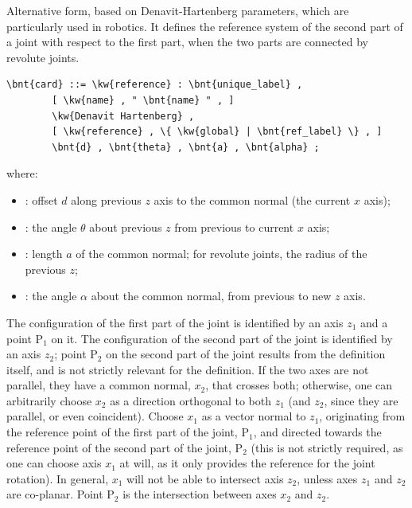 Alternative form, based on Denavit-Hartenberg parameters,
which are particularly used in robotics.
It defines the reference system of the second part of a joint with respect to the first part,
when the two parts are connected by revolute joints.
\begin{Verbatim}[commandchars=\\\{\}]
    \bnt{card} ::= \kw{reference} : \bnt{unique_label} , 
        [ \kw{name} , " \bnt{name} " , ]
        \kw{Denavit Hartenberg} ,
        [ \kw{reference} , \{ \kw{global} | \bnt{ref_label} \} , ]
        \bnt{d} , \bnt{theta} , \bnt{a} , \bnt{alpha} ;
\end{Verbatim}
where:
\begin{itemize}
\item {}: offset $d$ along previous $z$ axis to the common normal (the current $x$ axis);

\item {}: the angle $\theta$ about previous $z$ from previous to current $x$ axis;

\item {}: length $a$ of the common normal; for revolute joints, the radius of the previous $z$;

\item {}: the angle $\alpha$ about the common normal, from previous to new $z$ axis.
\end{itemize}
The configuration of the first part of the joint is identified by an axis $z_1$ and a point $\text{P}_1$ on it.
The configuration of the second part of the joint is identified by an axis $z_2$;
point $\text{P}_2$ on the second part of the joint results from the definition itself,
and is not strictly relevant for the definition.
If the two axes are not parallel, they have a common normal, $x_2$, that crosses both;
otherwise, one can arbitrarily choose $x_2$ as a direction orthogonal to both $z_1$
(and $z_2$, since they are parallel, or even coincident).
Choose $x_1$ as a vector normal to $z_1$, originating from the reference point of the first part of the joint, $\text{P}_1$,
and directed towards the reference point of the second part of the joint, $\text{P}_2$
(this is not strictly required, as one can choose axis $x_1$ at will, as it only provides the reference for the joint rotation).
In general, $x_1$ will not be able to intersect axis $z_2$, unless axes $z_1$ and $z_2$ are co-planar.
Point $\text{P}_2$ is the intersection between axes $x_2$ and $z_2$.
